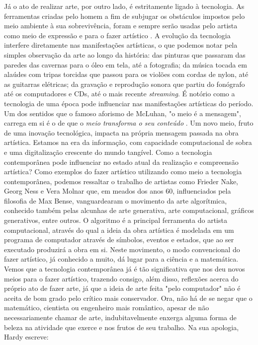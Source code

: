 \documentclass[12pt, a4paper, titlepage]{article}
\begin{document}
Já o ato de realizar arte, por outro lado, é estritamente ligado à tecnologia.
As ferramentas criadas pelo homem a fim de subjugar os obstáculos impostos
pelo meio ambiente à sua sobrevivência, foram e sempre serão usadas pelo artista como meio de expressão e para o fazer artístico \cite{gouzouasis}.
A evolução da tecnologia interfere diretamente nas manifestações artísticas, o que podemos notar pela simples observação da arte ao longo da história: das pinturas que passaram das paredes das cavernas para o óleo em tela, até
a fotografia; da música tocada em alaúdes com tripas torcidas que passou para os violões com cordas de nylon, até as guitarras elétricas; 
da gravação e reprodução sonora que partiu do fonógrafo até os computadores e CDs, até o mais recente \emph{streaming}. 
É notório como a tecnologia de uma época pode influenciar nas manifestações artísticas do período. 
Um dos sentidos que o famoso aforismo de McLuhan, "o meio é a mensagem", carrega em si é o de que o 
\emph{meio transforma o seu conteúdo} \cite[p.50]{braga_mcluhan}. 
Um novo meio, fruto de uma inovação tecnológica, impacta na própria mensagem passada na obra artística.
Estamos na era da informação, com capacidade computacional de sobra e uma digitalização crescente do mundo tangível. 
Como a tecnologia contemporânea pode influenciar no estado atual da realização e compreensão artística?
Como exemplos do fazer artístico utilizando como meio a tecnologia contemporânea, podemos ressaltar o trabalho
de artistas como Frieder Nake, Georg Ness e Vera Molnar que, em meados dos anos 60, influenciados pela filosofia de Max Bense, vanguardearam 
o movimento da arte algorítmica, conhecido também pelas alcunhas de arte generativa, arte computacional, gráficos generativos, entre outros.
O algoritmo é a principal ferramenta do artista computacional, através do qual a ideia da obra artística é modelada em um programa de computador através de símbolos, eventos e estados, que ao ser executado produzirá a obra em si. Neste movimento, o modo convencional do fazer artístico, já conhecido a muito, dá lugar para a ciência e a matemática. Vemos que a tecnologia contemporânea já é tão significativa que nos deu novos meios para o fazer artístico, trazendo consigo, além disso, reflexões acerca do próprio ato de fazer arte, já que a ideia de arte feita "pelo computador" não é aceita de bom grado pelo crítico
mais conservador.
Ora, não há de se negar que o matemático, cientista ou engenheiro mais romântico, apesar de não necessariamente chamar de arte, indubitavelmente enxerga alguma forma de beleza na atividade que exerce e nos frutos de seu trabalho. 
Na sua apologia, Hardy \cite{hardy_apology} escreve:
\end{document}
